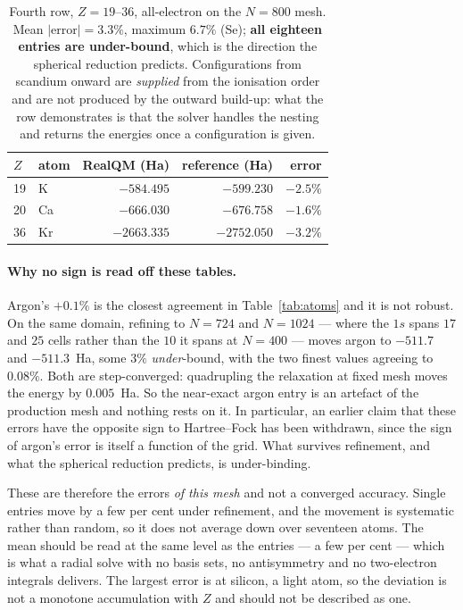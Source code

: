 \begin{table}[h]
\centering
\small
\caption{Fourth row, $Z=19$--$36$, all-electron on the $N=800$ mesh. Mean
$|\text{error}| = 3.3\%$, maximum $6.7\%$ (Se); \textbf{all eighteen entries are under-bound},
which is the direction the spherical reduction predicts. Configurations from scandium onward are
\emph{supplied} from the ionisation order and are not produced by the outward build-up: what the
row demonstrates is that the solver handles the nesting and returns the energies once a
configuration is given.}\label{tab:atoms4}
\begin{tabular}{llrrr}
\toprule
$Z$ & atom & RealQM (Ha) & reference (Ha) & error \\
\midrule
19 & K  & $-584.495$  & $-599.230$  & $-2.5\%$ \\
20 & Ca & $-666.030$  & $-676.758$  & $-1.6\%$ \\
36 & Kr & $-2663.335$ & $-2752.050$ & $-3.2\%$ \\
\bottomrule
\end{tabular}
\end{table}

\paragraph{Why no sign is read off these tables.}
Argon's $+0.1\%$ is the closest agreement in Table~\ref{tab:atoms} and it is not robust. On the
same domain, refining to $N = 724$ and $N = 1024$ --- where the $1s$ spans $17$ and $25$ cells
rather than the $10$ it spans at $N = 400$ --- moves argon to $-511.7$ and $-511.3$~Ha, some $3\%$
\emph{under}-bound, with the two finest values agreeing to $0.08\%$. Both are step-converged:
quadrupling the relaxation at fixed mesh moves the energy by $0.005$~Ha. So the near-exact argon
entry is an artefact of the production mesh and nothing rests on it. In particular, an earlier
claim that these errors have the opposite sign to Hartree--Fock has been withdrawn, since the sign
of argon's error is itself a function of the grid. What survives refinement, and what the
spherical reduction predicts, is under-binding.

These are therefore the errors \emph{of this mesh} and not a converged accuracy. Single entries
move by a few per cent under refinement, and the movement is systematic rather than random, so it
does not average down over seventeen atoms. The mean should be read at the same level as the
entries --- a few per cent --- which is what a radial solve with no basis sets, no antisymmetry
and no two-electron integrals delivers. The largest error is at silicon, a light atom, so the
deviation is not a monotone accumulation with $Z$ and should not be described as one.

